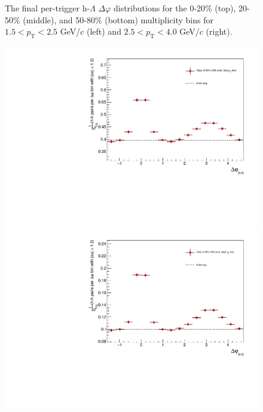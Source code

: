 \begin{figure}[ht]
\begin{minipage}{0.48\textwidth}
	\end{minipage}
	\caption{The final per-trigger h-$\Lambda$ $\Delta\varphi$ distributions for the 0-20\% (top), 20-50\% (middle), and 50-80\% (bottom) multiplicity bins for $1.5 < p_{\text{T}} < 2.5$ GeV/$c$ (left) and $2.5 < p_{\text{T}} < 4.0$ GeV/$c$ (right).}
	\label{fig:h_lambda_1d_final}
\end{figure}

\begin{figure}[ht]
	\centering
	\begin{minipage}{0.48\textwidth}
		\includegraphics[width=\textwidth]{figures/analysis/h_h_dphi_avg6_0_20_lowpt.pdf}
	\end{minipage}
	\begin{minipage}{0.48\textwidth}
		\includegraphics[width=\textwidth]{figures/analysis/h_h_dphi_avg6_0_20_highpt.pdf}

\end{minipage}
\end{figure}

